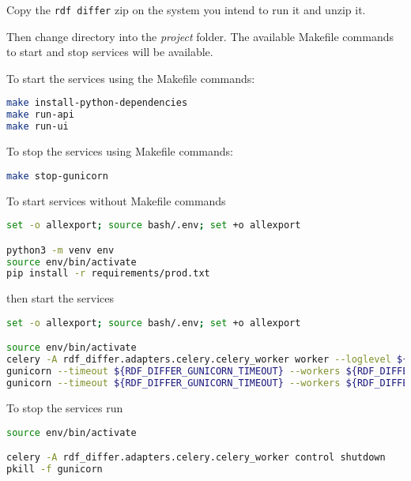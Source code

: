 Copy the \texttt{rdf differ} zip on the system you intend to run it and unzip it.

Then change directory into the \textit{project} folder. The available Makefile commands to start and stop services will be available.

To start the services using the Makefile commands:

\begin{lstlisting}[language=bash,]
make install-python-dependencies
make run-api
make run-ui
\end{lstlisting}

To stop the services using Makefile commands:

\begin{lstlisting}[language=bash,]
make stop-gunicorn
\end{lstlisting}

To start services without Makefile commands

\begin{lstlisting}[language=bash,]
set -o allexport; source bash/.env; set +o allexport

python3 -m venv env
source env/bin/activate
pip install -r requirements/prod.txt
\end{lstlisting}

then start the services

\begin{lstlisting}[language=bash,]
set -o allexport; source bash/.env; set +o allexport

source env/bin/activate
celery -A rdf_differ.adapters.celery.celery_worker worker --loglevel ${RDF_DIFFER_LOG_LEVEL} --logfile ${RDF_DIFFER_CELERY_LOGS} --detach
gunicorn --timeout ${RDF_DIFFER_GUNICORN_TIMEOUT} --workers ${RDF_DIFFER_GUNICORN_API_WORKERS} --bind 0.0.0.0:${RDF_DIFFER_API_PORT} --reload rdf_differ.entrypoints.api.run:app --log-file ${RDF_DIFFER_API_LOGS} --log-level ${RDF_DIFFER_LOG_LEVEL} --daemon
gunicorn --timeout ${RDF_DIFFER_GUNICORN_TIMEOUT} --workers ${RDF_DIFFER_GUNICORN_UI_WORKERS} --bind 0.0.0.0:${RDF_DIFFER_UI_PORT} --reload rdf_differ.entrypoints.ui.run:app --log-file ${RDF_DIFFER_UI_LOGS} --log-level ${RDF_DIFFER_LOG_LEVEL} --daemon
\end{lstlisting}

To stop the services run

\begin{lstlisting}[language=bash,]
source env/bin/activate

celery -A rdf_differ.adapters.celery.celery_worker control shutdown
pkill -f gunicorn
\end{lstlisting}